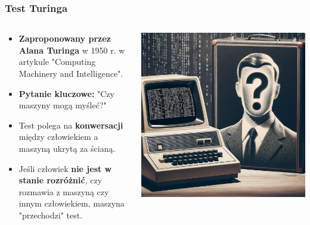 \documentclass[smaller]{beamer}
\begin{document}
\begin{frame}
\frametitle{Test Turinga}

\begin{columns}
    \begin{column}{0.6\textwidth}
        \begin{itemize}
            \item \textbf{Zaproponowany przez Alana Turinga} w 1950 r. w artykule "Computing Machinery and Intelligence".
            \item \textbf{Pytanie kluczowe:} "Czy maszyny mogą myśleć?"
            \item Test polega na \textbf{konwersacji} między człowiekiem a maszyną ukrytą za ścianą.
            \item Jeśli człowiek \textbf{nie jest w stanie rozróżnić}, czy rozmawia z maszyną czy innym człowiekiem, maszyna "przechodzi" test.
        \end{itemize}
    \end{column}

    \begin{column}{0.4\textwidth}
        \includegraphics[width=\textwidth]{../manifest/turing-test.png}
    \end{column}
\end{columns}
\end{frame}
\end{document}

